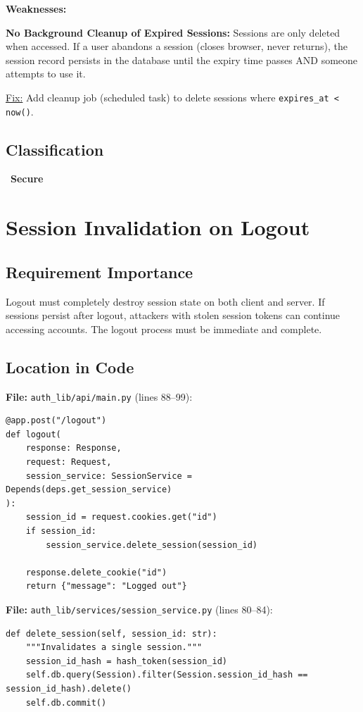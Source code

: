 \documentclass[11pt,a4paper]{article}
\newcommand{\secure}{\textcolor{securegreen}{\checkmark~\textbf{Secure}}}
\begin{document}
\textbf{Weaknesses:}

\textbf{No Background Cleanup of Expired Sessions:} Sessions are only deleted when accessed. If a user abandons a session (closes browser, never returns), the session record persists in the database until the expiry time passes AND someone attempts to use it.

\underline{Fix:} Add cleanup job (scheduled task) to delete sessions where \texttt{expires\_at < now()}.

\subsection{Classification}
\secure

\newpage
\section{Session Invalidation on Logout}

\subsection{Requirement Importance}
Logout must completely destroy session state on both client and server. If sessions persist after logout, attackers with stolen session tokens can continue accessing accounts. The logout process must be immediate and complete.

\subsection{Location in Code}

\textbf{File:} \texttt{auth\_lib/api/main.py} (lines 88--99):
\begin{lstlisting}
@app.post("/logout")
def logout(
    response: Response,
    request: Request,
    session_service: SessionService = Depends(deps.get_session_service)
):
    session_id = request.cookies.get("id")
    if session_id:
        session_service.delete_session(session_id)
        
    response.delete_cookie("id")
    return {"message": "Logged out"}
\end{lstlisting}

\textbf{File:} \texttt{auth\_lib/services/session\_service.py} (lines 80--84):
\begin{lstlisting}
def delete_session(self, session_id: str):
    """Invalidates a single session."""
    session_id_hash = hash_token(session_id)
    self.db.query(Session).filter(Session.session_id_hash == session_id_hash).delete()
    self.db.commit()
\end{lstlisting}
\end{document}
